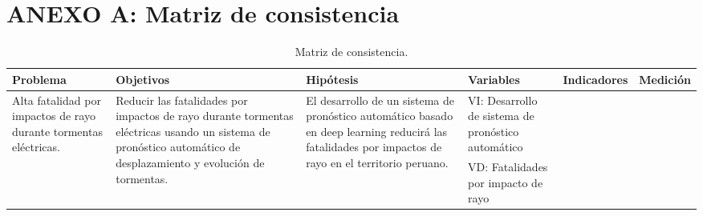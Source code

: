 \section*{ANEXO A: Matriz de consistencia}
{}

\renewcommand\thetable{A.\arabic{table}}  
\setcounter{table}{0} 

\begin{sidewaystable}[htbp]
  \centering
  \small
  \label{tab:matriz_consistencia}
  \caption{Matriz de consistencia.}
  \begin{tabular}{p{2cm}|p{3.5cm}|p{3cm}|p{2.5cm}|p{2.5cm}|p{2.5cm}}
  Problema                                                                           & Objetivos                                                                                                                                                                           & Hipótesis                                                                                                                                                             & Variables                                          & Indicadores                                             & Medición                              \\ \hline
  \multirow{2}{2cm}{Alta fatalidad por impactos de rayo durante tormentas eléctricas.} & \multirow{2}{3.5cm}{Reducir las fatalidades por impactos de rayo durante tormentas eléctricas  usando un sistema de pronóstico automático de desplazamiento y evolución de  tormentas.} & \multirow{2}{3cm}{El desarrollo de un sistema de pronóstico automático basado en deep learning reducirá las fatalidades por impactos de rayo en el territorio peruano.} & VI: Desarrollo de sistema de pronóstico automático \newline &                                                         &                                       \\
                                                                                     &                                                                                                                                                                                     &                                                                                                                                                                       & VD: Fatalidades por impacto de rayo  \newline               &                                                         &                                       \\ \hline

\end{tabular}
\end{sidewaystable}

